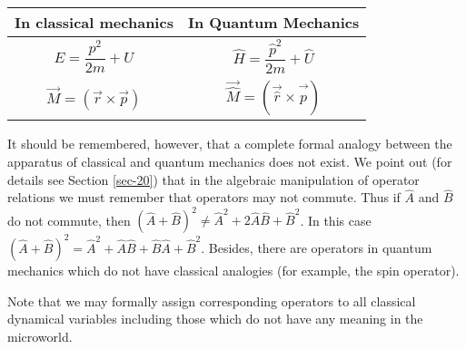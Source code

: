 \documentclass[a4paper,sfsidenotes,colorlinks=true]{tufte-book}
\numberwithin{equation}{section}
\numberwithin{figure}{section}
\begin{document}
\begin{table}
\begin{tabular}{p{4cm}p{4cm}}
\toprule
\textbf{In classical mechanics} & \textbf{In Quantum Mechanics}\\[3pt]
\midrule
\begin{minipage}{4cm}\begin{equation*} E = \frac{p^{2}}{2m} + U \end{equation*}\end{minipage} & \begin{minipage}{4cm}\begin{equation} \hat{H} = \frac{\hat{p}^{2}}{2m} + \hat{U} \label{eq-19.1}\end{equation}\end{minipage}\\
\begin{minipage}{4cm}\begin{equation*} \vec{M} = \left( \vec{r}
      \times \vec{p} \right) \end{equation*}\end{minipage} & \begin{minipage}{4cm}\begin{equation}  \vec{\hat{M}} = \left( \vec{\hat{r}}
      \times \vec{\hat{p}} \right)  \label{eq-19.2}\end{equation}\end{minipage}\\[5pt]
\bottomrule
\end{tabular}
\label{correspondence-table}
\end{table}

It should be remembered, however, that a complete formal analogy
between the apparatus of classical and quantum mechanics does not
exist. We point out (for details see Section \ref{sec-20}) that in the
algebraic manipulation of operator relations we must remember that
operators may not commute. Thus if $\hat{A}$ and $\hat{B}$ do not
commute, then $\left( \hat{A} + \hat{B} \right)^{2} \ne \hat{A}^{2} + 2 \hat{A}
\hat{B} + \hat{B}^{2}$. In this case $\left( \hat{A} + \hat{B} \right)^{2} =
\hat{A}^{2} +  \hat{A} \hat{B} + \hat{B}\hat{A} +\hat{B}^{2}$. Besides, there are
operators in quantum mechanics which do not have classical analogies
(for example, the spin operator).


Note that we may formally assign corresponding operators to all
classical dynamical variables including those which do not have any
meaning in the microworld.
\end{document}
